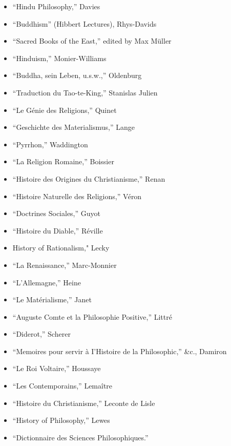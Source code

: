 \documentclass[]{book}
\begin{document}
\begin{itemize}
\item
  ``Hindu Philosophy,'' Davies
\item
  ``Buddhism'' (Hibbert Lectures), Rhys-Davids
\item
  ``Sacred Books of the East,'' edited by Max Müller
\item
  ``Hinduism,'' Monier-Williams
\item
  ``Buddha, sein Leben, u.s.w.,'' Oldenburg
\item
  ``Traduction du Tao-te-King,'' Stanislas Julien
\item
  ``Le Génie des Religions,'' Quinet
\item
  ``Geschichte des Materialismus,'' Lange
\item
  ``Pyrrhon,'' Waddington
\item
  ``La Religion Romaine,'' Boissier
\item
  ``Histoire des Origines du Christianisme,'' Renan
\item
  ``Histoire Naturelle des Religions,'' Véron
\item
  ``Doctrines Sociales,'' Guyot
\item
  ``Histoire du Diable,'' Réville
\item
  History of Rationalism," Lecky
\item
  ``La Renaissance,'' Marc-Monnier
\item
  ``L'Allemagne,'' Heine
\item
  ``Le Matérialisme,'' Janet
\item
  ``Auguste Comte et la Philosophie Positive,'' Littré
\item
  ``Diderot,'' Scherer
\item
  ``Memoires pour servir à I'Histoire de la Philosophic,'' \&c., Damiron
\item
  ``Le Roi Voltaire,'' Houssaye
\item
  ``Les Contemporains,'' Lemaître
\item
  ``Histoire du Christianisme,'' Leconte de Lisle
\item
  ``History of Philosophy,'' Lewes
\item
  ``Dictionnaire des Sciences Philosophiques.''
\end{itemize}


\end{document}
